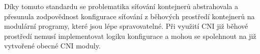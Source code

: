 Díky tomuto standardu se problematika síťování kontejnerů abstrahovala a přesunula zodpovědnost konfigurace síťování z běhových prostředí kontejnerů na modulární programy, které jsou lépe spravovatelné. Při využití CNI již běhové prostředí nemusí implementovat logiku konfigurace a mohou se spolehnout na již vytvořené obecné CNI moduly.